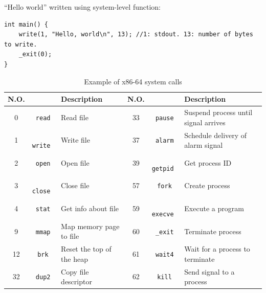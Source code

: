 ``Hello world'' written using system-level function:
\begin{lstlisting}
int main() {
	write(1, "Hello, world\n", 13); //1: stdout. 13: number of bytes to write.
	_exit(0);
}
\end{lstlisting}
\begin{table}[ht]
\centering
\caption{Example of x86-64 system calls}
\begin{tabular}{c|>{\tt}c|l||c|>{\tt}c|l}\toprule
N.O.& \multicolumn{1}{c|}{Name} & Description & N.O. & \multicolumn{1}{c|}{Name} & Description \\\midrule
0 & read & Read file & 33 & pause & Suspend process until signal arrives\\
1 & write & Write file & 37 & alarm & Schedule delivery of alarm signal \\
2 & open & Open file & 39 & getpid & Get process ID\\
3 & close & Close file & 57 & fork & Create process\\
4 & stat & Get info about file & 59 & execve & Execute a program\\
9 & mmap & Map memory page to file & 60 & \_exit & Terminate process\\
12 & brk & Reset the top of the heap & 61 & wait4 & Wait for a process to terminate \\
32 & dup2 & Copy file descriptor & 62 & kill & Send signal to a process\\\bottomrule
\end{tabular}
\end{table}
